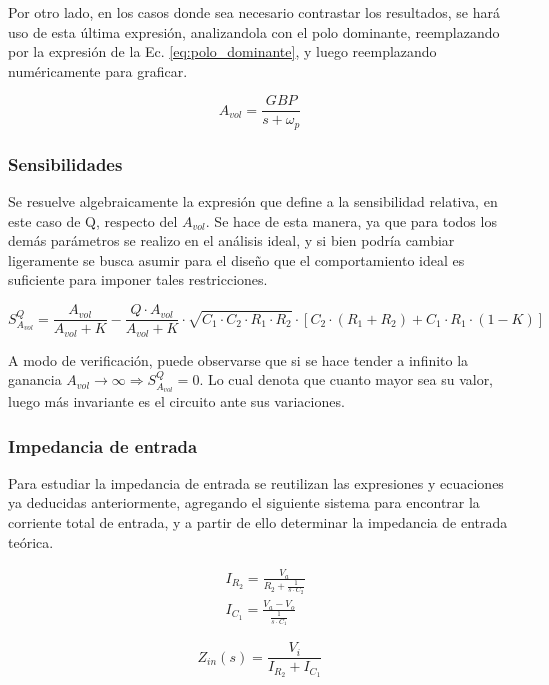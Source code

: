 Por otro lado, en los casos donde sea necesario contrastar los resultados, se har\'a uso de esta \'ultima expresi\'on, analizandola con el polo dominante,
reemplazando por la expresi\'on de la Ec. \ref{eq:polo_dominante}, y luego reemplazando num\'ericamente para graficar.

\begin{equation}
A_{vol} = \frac{GBP}{s + \omega_p}
\label{eq:polo_dominante}
\end{equation}

\subsubsection{Sensibilidades}
Se resuelve algebraicamente la expresi\'on que define a la sensibilidad relativa, en este caso de Q, respecto del $A_{vol}$. Se hace de esta manera, ya que para todos los dem\'as par\'ametros
se realizo en el an\'alisis ideal, y si bien podr\'ia cambiar ligeramente se busca asumir para el dise\~no que el comportamiento ideal es suficiente para imponer tales restricciones.

\begin{equation}
S^{Q}_{A_{vol}} = \frac{A_{vol}}{A_{vol} + K}
- \frac{Q \cdot A_{vol}}{A_{vol} + K} \cdot \sqrt{C_1 \cdot C_2 \cdot R_1 \cdot R_2}
\cdot \left[ C_2 \cdot (R_1 + R_2) + C_1 \cdot R_1 \cdot (1 - K) \right]
\end{equation}

A modo de verificaci\'on, puede observarse que si se hace tender a infinito la ganancia $A_{vol} \rightarrow \infty \Rightarrow S^{Q}_{A_{vol}} = 0$.
Lo cual denota que cuanto mayor sea su valor, luego m\'as invariante es el circuito ante sus variaciones.

\subsubsection{Impedancia de entrada}
Para estudiar la impedancia de entrada se reutilizan las expresiones y ecuaciones ya deducidas anteriormente, agregando
el siguiente sistema para encontrar la corriente total de entrada, y a partir de ello determinar la impedancia de entrada te\'orica.

\begin{align*}
& I_{R_2} = \frac{V_a}{R_2 + \frac{1}{s \cdot C_2}} \\
& I_{C_1} = \frac{V_a - V_o}{\frac{1}{s \cdot C_1}}
\end{align*}

\begin{equation}
Z_{in}(s) = \frac{V_i}{I_{R_2} + I_{C_1}}
\end{equation}

